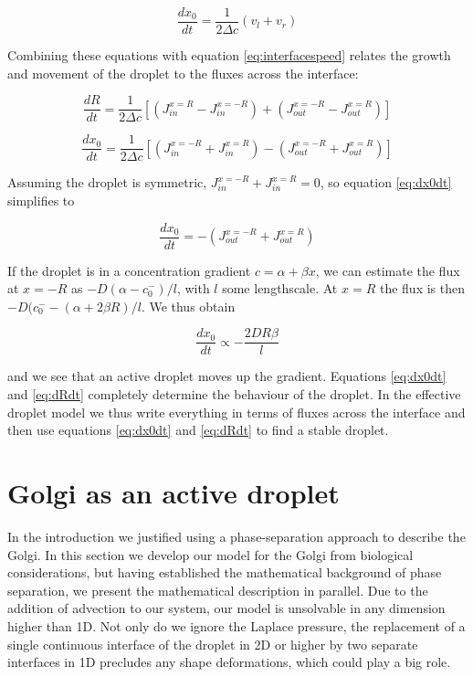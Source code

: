 \documentclass{Dissertate}
\begin{document}
\begin{equation}
\frac{dx_0}{dt}=\frac{1}{2\Delta c}(v_l+v_r)
\label{eq:position}\end{equation}

Combining these equations with equation \ref{eq:interfacespeed}
relates the growth and movement of the droplet to the fluxes
across the interface: 

\begin{equation}
	\label{eq:dRdt}
	\frac{dR}{dt}=\frac{1}{2\Delta c}\left[(J_{in}^{x=R}-J_{in}^{x=-R})+(J_{out}^{x=-R}-J_{out}^{x=R})\right]
\end{equation}

\begin{equation}
\label{eq:dx0dt}
	\frac{dx_0}{dt}=\frac{1}{2\Delta c}\left[(J_{in}^{x=-R}+J_{in}^{x=R})-(J_{out}^{x=-R}+J_{out}^{x=R})\right]
\end{equation}

Assuming the droplet is symmetric, $J_{in}^{x=-R}+J_{in}^{x=R}=0$, so equation \ref{eq:dx0dt} simplifies to

\begin{equation}
	\frac{dx_0}{dt}=-(J_{out}^{x=-R}+J_{out}^{x=R})
\end{equation}

If the droplet is in a concentration gradient $c = \alpha+\beta x$, we can estimate the flux at $x=-R$ as $-D(\alpha-c_0^-)/l$, with $l$ some lengthscale. At $x=R$ the flux is then $-D(c_0^--(\alpha+2\beta R)/l$. We thus obtain

\begin{equation}
	\frac{dx_0}{dt} \propto -\frac{2DR\beta}{l}
\end{equation}

and we see that an active droplet moves up the gradient. Equations \ref{eq:dx0dt} and \ref{eq:dRdt} completely determine the behaviour of the droplet. In the effective droplet model we thus write everything in terms of fluxes across the interface and then use equations \ref{eq:dx0dt} and \ref{eq:dRdt} to find a stable droplet.

\hypertarget{Golgi-as-an-active-droplet}{%
\section{Golgi as an active droplet}\label{Golgi-as-an-active-droplet}}

In the introduction we justified using a phase-separation approach to
describe the Golgi. In this section we develop our model for the Golgi
from biological considerations, but having established the mathematical
background of phase separation, we present the mathematical
description in parallel. Due to the addition of advection to our system, our model is unsolvable in any dimension higher than 1D. Not only do we ignore the Laplace pressure, the replacement of a single continuous interface of the droplet in 2D or higher by two separate interfaces in 1D precludes any shape deformations, which could play a big role. 
\end{document}
